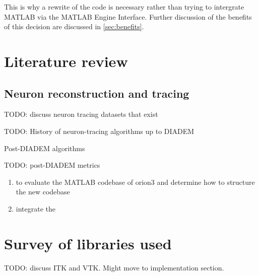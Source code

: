 This is why a rewrite of the code is necessary rather than trying
to intergrate MATLAB via the MATLAB Engine Interface. Further
discussion of the benefits of this decision are discussed in \cref{sec:benefits}.

\section{Literature review}

\subsection{Neuron reconstruction and tracing}\label{subsec:neuron-tracing}

TODO: discuss neuron tracing datasets that exist
~\autocite{Duke-Southampton-archive:Cannon:1998,DIADEM-dataset:Brown:2011}

TODO: History of neuron-tracing algorithms up to DIADEM
~\autocite{DIADEM&Beyond:Liu:2011,NeuroMorphTrends:Halavi:2012,NeuroTracePerspect:Meijering:2010}

Post-DIADEM algorithms
~\autocite{Bauer2010,MIA-anisotropic-path-searching-Xie2011,MICCAI-anisotropic-path-searching-Xie2010,
Jeong2015,Luo2015,De2015,Gulyanon2015,ORION_Santamaria-Pang2015,Mukherjee2014,Hernandez-Herrera2014,Basu2014,Xiao2013,Jimenez2013,Basu2013,Mukherjee2013,Hernandez-Herrera2013,Ming2013,Lee2012,Czarnecki2012}

TODO: post-DIADEM metrics~\autocite{Mayerich2011,Mayerich2012,btmorph-Torben-Nielsen2014,Costa2014,Gillette2015}

\begin{enumerate}[label=(\roman*)]
\item to evaluate the MATLAB codebase of \gls{orion3} and determine how to structure the new codebase
\item integrate the
\end{enumerate}

%

\section{Survey of libraries used}

TODO: discuss ITK and VTK. Might move to implementation section.


